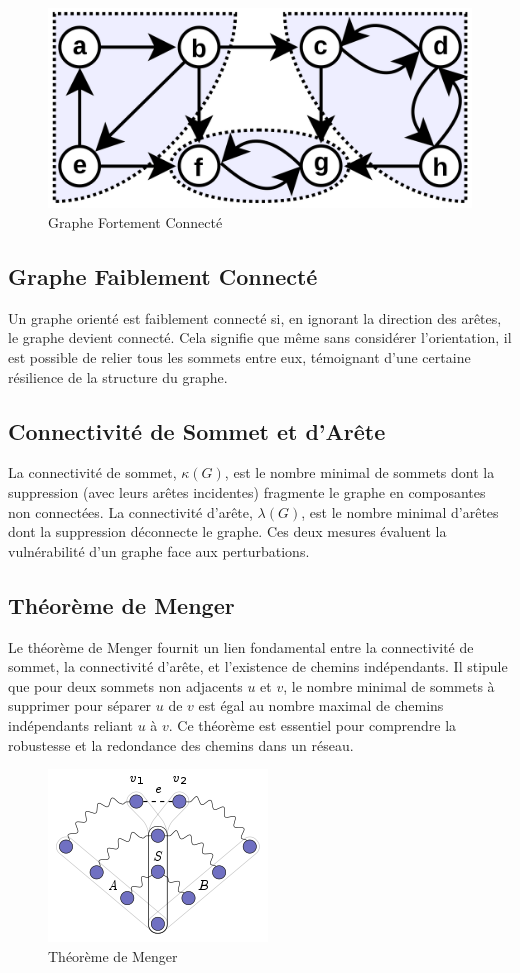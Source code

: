 \begin{figure}[H]
    \centering
    \includegraphics[width=0.3 \textwidth]{Assets/graphe fortement connecte.png}
    \caption{Graphe Fortement Connecté}
    \label{fig:Graphe Fortement Connecté}
\end{figure}

\subsection{Graphe Faiblement Connecté}
Un graphe orienté est faiblement connecté si, en ignorant la direction des arêtes, le graphe devient connecté. Cela signifie que même sans considérer l'orientation, il est possible de relier tous les sommets entre eux, témoignant d'une certaine résilience de la structure du graphe.



\newpage


\subsection{Connectivité de Sommet et d'Arête}
La connectivité de sommet, \( \kappa(G) \), est le nombre minimal de sommets dont la suppression (avec leurs arêtes incidentes) fragmente le graphe en composantes non connectées. La connectivité d'arête, \( \lambda(G) \), est le nombre minimal d'arêtes dont la suppression déconnecte le graphe. Ces deux mesures évaluent la vulnérabilité d'un graphe face aux perturbations.

\subsection{Théorème de Menger}
Le théorème de Menger fournit un lien fondamental entre la connectivité de sommet, la connectivité d'arête, et l'existence de chemins indépendants. Il stipule que pour deux sommets non adjacents \( u \) et \( v \), le nombre minimal de sommets à supprimer pour séparer \( u \) de \( v \) est égal au nombre maximal de chemins indépendants reliant \( u \) à \( v \). Ce théorème est essentiel pour comprendre la robustesse et la redondance des chemins dans un réseau.
\begin{figure}[H]
    \centering
    \includegraphics[width=0.4 \textwidth]{Assets/menger.png}
    \caption{Théorème de Menger}
    \label{fig:Théorème de Menger}
\end{figure}
